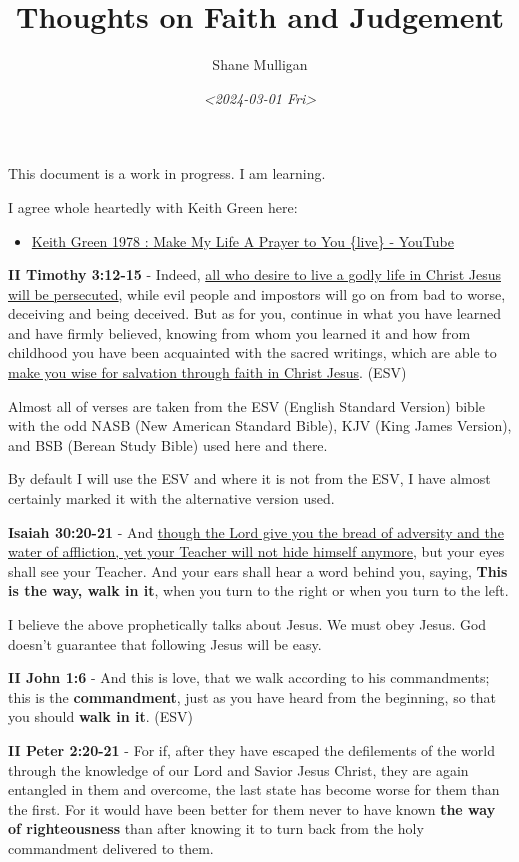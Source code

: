 \documentclass[11pt]{article}
\author{Shane Mulligan}
\date{\textit{<2024-03-01 Fri>}}
\title{Thoughts on Faith and Judgement}
\begin{document}
\maketitle
This document is a work in progress. I am learning.

I agree whole heartedly with Keith Green here:
\begin{itemize}
\item \href{https://www.youtube.com/watch?v=z7oCa9BvO9g}{Keith Green 1978 : Make My Life A Prayer to You \{live\} - YouTube}
\end{itemize}

\textbf{II Timothy 3:12-15} - Indeed, \uline{all who desire to live a godly life in Christ Jesus will be persecuted}, while evil people and impostors will go on from bad to worse, deceiving and being deceived. But as for you, continue in what you have learned and have firmly believed, knowing from whom you learned it and how from childhood you have been acquainted with the sacred writings, which are able to \uline{make you wise for salvation through faith in Christ Jesus}. (ESV)

Almost all of verses are taken from the ESV
(English Standard Version) bible with the odd NASB
(New American Standard Bible), KJV (King
James Version), and BSB (Berean Study Bible) used here and there.

By default I will use the ESV and where it is
not from the ESV, I have almost certainly marked it with the alternative version used.

\textbf{Isaiah 30:20-21} - And \uline{though the Lord give you the bread of adversity and the water of affliction, yet your Teacher will not hide himself anymore}, but your eyes shall see your Teacher. And your ears shall hear a word behind you, saying, \textbf{This is the way, walk in it}, when you turn to the right or when you turn to the left.

I believe the above prophetically talks about Jesus. We must obey Jesus. God doesn't guarantee that following Jesus will be easy.

\textbf{II John 1:6} - And this is love, that we walk according to his commandments; this is the \textbf{commandment}, just as you have heard from the beginning, so that you should \textbf{walk in it}. (ESV)

\textbf{II Peter 2:20-21} - For if, after they have escaped the defilements of the world through the knowledge of our Lord and Savior Jesus Christ, they are again entangled in them and overcome, the last state has become worse for them than the first. For it would have been better for them never to have known \textbf{the way of righteousness} than after knowing it to turn back from the holy commandment delivered to them.
\end{document}
